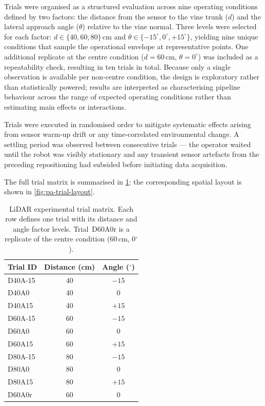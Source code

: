 Trials were organised as a structured evaluation across nine operating conditions defined by two factors: the distance from the sensor to the vine trunk ($d$) and the lateral approach angle ($\theta$) relative to the vine normal. Three levels were selected for each factor: $d \in \{40, 60, 80\}$\,cm and $\theta \in \{-15^{\circ}, 0^{\circ}, {+}15^{\circ}\}$, yielding nine unique conditions that sample the operational envelope at representative points. One additional replicate at the centre condition ($d = 60$\,cm, $\theta = 0^{\circ}$) was included as a repeatability check, resulting in ten trials in total. Because only a single observation is available per non-centre condition, the design is exploratory rather than statistically powered; results are interpreted as characterising pipeline behaviour across the range of expected operating conditions rather than estimating main effects or interactions.

Trials were executed in randomised order to mitigate systematic effects arising from sensor warm-up drift or any time-correlated environmental change. A settling period was observed between consecutive trials --- the operator waited until the robot was visibly stationary and any transient sensor artefacts from the preceding repositioning had subsided before initiating data acquisition.

The full trial matrix is summarised in \cref{tab:pa-trial-matrix}; the corresponding spatial layout is shown in \cref{fig:pa-trial-layout}.

\begin{table}[htbp]
  \centering
  \caption{LiDAR experimental trial matrix. Each row defines one trial with its distance and angle factor levels. Trial~D60A0r is a replicate of the centre condition (60\,cm, 0$^{\circ}$).}
  \label{tab:pa-trial-matrix}
  \begin{tabularx}{\textwidth}{l c c}
    \toprule
    \textbf{Trial ID} & \textbf{Distance (cm)} & \textbf{Angle ($^{\circ}$)} \\
    \midrule
    D40A-15 & 40 & $-15$ \\
    D40A0   & 40 &    $0$ \\
    D40A15  & 40 & ${+}15$ \\
    D60A-15 & 60 & $-15$ \\
    D60A0   & 60 &    $0$ \\
    D60A15  & 60 & ${+}15$ \\
    D80A-15 & 80 & $-15$ \\
    D80A0   & 80 &    $0$ \\
    D80A15  & 80 & ${+}15$ \\
    D60A0r  & 60 &    $0$ \\
    \bottomrule
  \end{tabularx}
\end{table}

